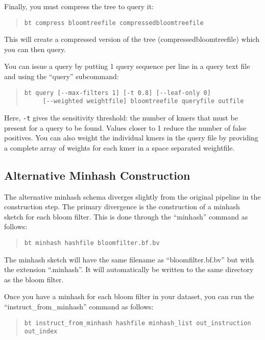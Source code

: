 \documentclass{article}
\begin{document}
Finally, you must compress the tree to query it:
\begin{quote}
\begin{verbatim}
bt compress bloomtreefile compressedbloomtreefile
\end{verbatim}
\end{quote}
This will create a compressed version of the tree (compressedbloomtreefile) which you can then query.

You can issue a query by putting 1 query sequence per line in a query text file and using the ``query'' subcommand:
\begin{quote}
\begin{lstlisting}
bt query [--max-filters 1] [-t 0.8] [--leaf-only 0] 
	 [--weighted weightfile] bloomtreefile queryfile outfile
\end{lstlisting}
\end{quote}
Here, \verb+-t+ gives the sensitivity threshold: the number of kmers that must be present for a query to be found. Values closer to 1 reduce the number of false positives. You can also weight the individual kmers in the query file by providing a complete array of weights for each kmer in a space separated weightfile.

\subsection{Alternative Minhash Construction}
The alternative minhash schema diverges slightly from the original pipeline in the construction step. The primary divergence is the construction of a minhash sketch for each bloom filter. This is done through the ``minhash'' command as follows:

\begin{quote}
\begin{verbatim}
bt minhash hashfile bloomfilter.bf.bv
\end{verbatim}
\end{quote}

The minhash sketch will have the same filename as ``bloomfilter.bf.bv'' but with the extension ``.minhash''. It will automatically be written to the same directory as the bloom filter. 

Once you have a minhash for each bloom filter in your dataset, you can run the ``instruct\_from\_minhash'' command as follows:

\begin{quote}
\begin{verbatim}
bt instruct_from_minhash hashfile minhash_list out_instruction out_index
\end{verbatim}
\end{quote}
\end{document}
